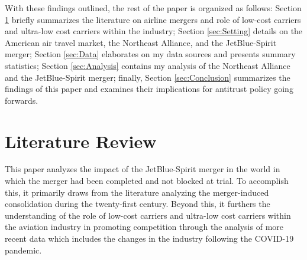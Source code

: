 \documentclass{article}
\begin{document}
	With these findings outlined, the rest of the paper is organized as follows: Section \ref{sec:Literature} briefly summarizes the literature on airline mergers and role of low-cost carriers and ultra-low cost carriers within the industry; Section \ref{sec:Setting} details on the American air travel market, the Northeast Alliance, and the JetBlue-Spirit merger; Section \ref{sec:Data} elaborates on my data sources and presents summary statistics; Section \ref{sec:Analysis} contains my analysis of the Northeast Alliance and the JetBlue-Spirit merger; finally, Section \ref{sec:Conclusion} summarizes the findings of this paper and examines their implications for antitrust policy going forwards. 
  
	\section{Literature Review}
	\label{sec:Literature}

    This paper analyzes the impact of the JetBlue-Spirit merger in the world in which the merger had been completed and not blocked at trial. To accomplish this, it primarily draws from the literature analyzing the merger-induced consolidation during the twenty-first century.  Beyond this, it furthers the understanding of the role of low-cost carriers and ultra-low cost carriers within the aviation industry in promoting competition through the analysis of more recent data which includes the changes in the industry following the COVID-19 pandemic.
	
\end{document}
